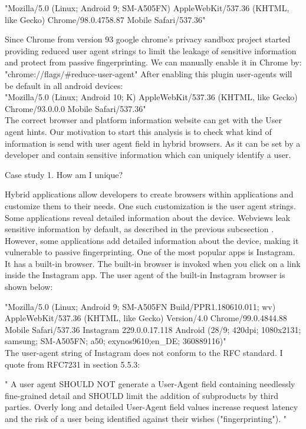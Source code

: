                 "{Mozilla/5.0 (Linux; Android 9; SM-A505FN) AppleWebKit/537.36 (KHTML,                like Gecko) Chrome/98.0.4758.87 Mobile Safari/537.36}" \\
\par
 Since Chrome from version 93 google chrome's privacy sandbox project started providing reduced user agent strings to limit the leakage of sensitive information and protect from passive fingerprinting. We can manually enable it in Chrome by: "{chrome://flags/\#reduce-user-agent}"
After enabling this plugin user-agents will be default in all android devices:\\

       "{Mozilla/5.0 (Linux; Android 10; K) AppleWebKit/537.36 (KHTML, like  Gecko) Chrome/93.0.0.0 Mobile Safari/537.36}" \\
       
The correct browser and platform information website can get with the User agent hints\cite{useragentred}.
Our motivation to start this analysis is to check what kind of information is send with user agent field in hybrid browsers. As it can be set by a developer and contain sensitive information which can uniquely identify a user. 

Case study 1. How am I unique?\par
Hybrid applications allow developers to create browsers within applications and customize them to their needs. One such customization is the user agent strings. Some applications reveal detailed information about the device. Webviews leak sensitive information by default, as described in the previous subcsection . However, some applications add detailed information about the device, making it vulnerable to passive fingerprinting. One of the most popular apps is Instagram. It has a built-in browser. The built-in browser is invoked when you click on a link inside the Instagram app. The user agent of the built-in Instagram browser is shown below:\par

           {"Mozilla/5.0 (Linux; Android 9; SM-A505FN Build/PPR1.180610.011; wv) AppleWebKit/537.36 (KHTML, like Gecko) Version/4.0  Chrome/99.0.4844.88 Mobile Safari/537.36 Instagram 229.0.0.17.118  Android (28/9; 420dpi; 1080x2131;           samsung; SM-A505FN; a50; exynos9610;en\_DE; 360889116)"}
\\
The user-agent string of Instagram does not conform to the RFC standard. I quote from RFC7231 in section 5.5.3\cite{rfc}:

    {" A user agent SHOULD NOT generate a User-Agent field  containing needlessly fine-grained detail and SHOULD limit the addition of  subproducts by third parties.  Overly long and detailed User-Agent  field values increase request latency and the risk of a user being identified against their wishes ("fingerprinting"). "}


